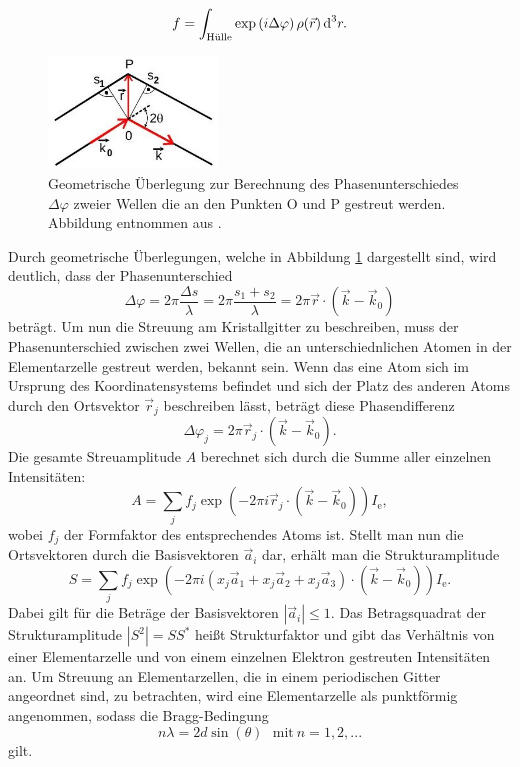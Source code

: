 \begin{equation}
  f=\int_\text{Hülle}\exp\left(i\Delta\varphi\right)\rho(\vec r)\,\text{d}^3r.
\end{equation}
\begin{figure}
\includegraphics[width=0.4\textwidth]{abb8.jpg}
\caption{Geometrische Überlegung zur Berechnung des Phasenunterschiedes $\Delta \varphi$ zweier Wellen die an den Punkten O und P gestreut werden. Abbildung entnommen aus \cite{V41}.}
\label{abb:8}
\end{figure}
Durch geometrische Überlegungen, welche in Abbildung \ref{abb:8} dargestellt sind, wird deutlich, dass der Phasenunterschied
\begin{equation}
  \label{eq:7}
  \Delta \varphi=2\pi \frac{\Delta s}{\lambda}=2\pi \frac{s_1+s_2}{\lambda}=2\pi\vec r \cdot \left(\vec k- \vec k_0\right)
\end{equation}
beträgt.
Um nun die Streuung am Kristallgitter zu beschreiben, muss  der Phasenunterschied zwischen zwei Wellen, die an unterschiednlichen Atomen in der Elementarzelle gestreut werden, bekannt sein.
Wenn das eine Atom sich im Ursprung des Koordinatensystems befindet und sich der Platz des anderen Atoms durch den Ortsvektor $\vec r_j$ beschreiben lässt, beträgt diese Phasendifferenz
\begin{equation}
  \Delta \varphi_j = 2\pi \vec r_j\cdot \left(\vec k-\vec k_0\right).
\end{equation}
Die gesamte Streuamplitude $A$ berechnet sich durch die Summe aller einzelnen Intensitäten:
\begin{equation}
  A=\sum_jf_j\exp\left(-2\pi i \vec r _j\cdot\left(\vec k-\vec k_0\right)\right)I_\text{e},
\end{equation}
wobei $f_j$ der Formfaktor des entsprechendes Atoms ist.
Stellt man nun die Ortsvektoren durch die Basisvektoren $\vec a_i$ dar, erhält man die Strukturamplitude
\begin{equation}
  S=\sum_jf_j\exp\left(-2\pi i \left(x_j\vec a_1+x_j\vec a_2+x_j\vec a_3 \right)\cdot\left(\vec k-\vec k_0\right)\right)I_\text{e}.
\end{equation}
Dabei gilt für die Beträge der Basisvektoren $|\vec a_i|\le 1$.
Das Betragsquadrat der Strukturamplitude  $|S^2|=SS^*$ heißt Strukturfaktor und gibt das Verhältnis von einer Elementarzelle und von einem einzelnen Elektron gestreuten Intensitäten an.
Um Streuung an Elementarzellen, die in einem periodischen Gitter angeordnet sind, zu betrachten, wird eine Elementarzelle als punktförmig angenommen, sodass die Bragg-Bedingung
\begin{equation}
  n\lambda=2d\sin\left(\theta\right)~~~\text{mit}~n=1,2,...
\end{equation}
gilt.

